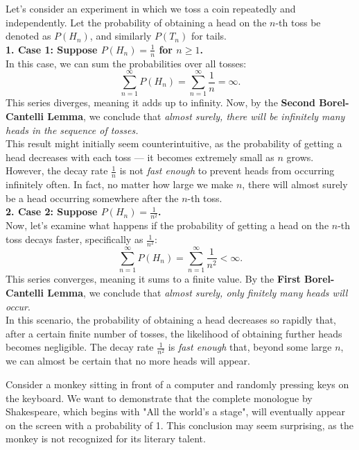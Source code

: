 \begin{example}
    Let’s consider an experiment in which we toss a coin repeatedly and independently. Let the probability of obtaining a head on the \( n \)-th toss be denoted as \( P(H_n) \), and similarly \( P(T_n) \) for tails.\\

    \textbf{1. Case 1: Suppose \( P(H_n) = \frac{1}{n} \) for \( n \geq 1 \).}\\

In this case, we can sum the probabilities over all tosses:
\[
\sum_{n=1}^{\infty} P(H_n) = \sum_{n=1}^{\infty} \frac{1}{n} = \infty.
\]
This series diverges, meaning it adds up to infinity. Now, by the \textbf{Second Borel-Cantelli Lemma}, we conclude that \textit{almost surely, there will be infinitely many heads in the sequence of tosses.}\\

This result might initially seem counterintuitive, as the probability of getting a head decreases with each toss — it becomes extremely small as \( n \) grows. However, the decay rate \( \frac{1}{n} \) is not \textit{fast enough} to prevent heads from occurring infinitely often. In fact, no matter how large we make \( n \), there will almost surely be a head occurring somewhere after the \( n \)-th toss.\\

\textbf{2. Case 2: Suppose \( P(H_n) = \frac{1}{n^2} \).}\\

Now, let’s examine what happens if the probability of getting a head on the \( n \)-th toss decays faster, specifically as \( \frac{1}{n^2} \):
\[
\sum_{n=1}^{\infty} P(H_n) = \sum_{n=1}^{\infty} \frac{1}{n^2} < \infty.
\]
This series converges, meaning it sums to a finite value. By the \textbf{First Borel-Cantelli Lemma}, we conclude that \textit{almost surely, only finitely many heads will occur}.\\

In this scenario, the probability of obtaining a head decreases so rapidly that, after a certain finite number of tosses, the likelihood of obtaining further heads becomes negligible. The decay rate \( \frac{1}{n^2} \) is \textit{fast enough} that, beyond some large \( n \), we can almost be certain that no more heads will appear.

\end{example}

\begin{exercise}
    Consider a monkey sitting in front of a computer and randomly pressing keys on the keyboard. We want to demonstrate that the complete monologue by Shakespeare, which begins with "All the world's a stage", will eventually appear on the screen with a probability of 1. This conclusion may seem surprising, as the monkey is not recognized for its literary talent.
\end{exercise}

